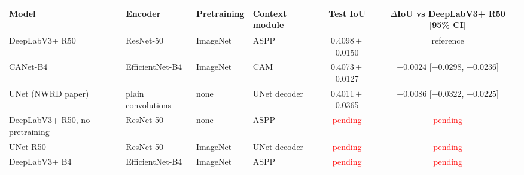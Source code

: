 \begin{tabular}{llllcc}
\toprule
Model & Encoder & Pretraining & Context module & Test IoU & $\Delta$IoU vs DeepLabV3+ R50 [95\% CI] \\
\midrule
DeepLabV3+ R50 & ResNet-50 & ImageNet & ASPP & 0.4098\,$\pm$\,0.0150 & reference \\
CANet-B4 & EfficientNet-B4 & ImageNet & CAM & 0.4073\,$\pm$\,0.0127 & $-0.0024$ [$-0.0298$, $+0.0236$] \\
UNet (NWRD paper) & plain convolutions & none & UNet decoder & 0.4011\,$\pm$\,0.0365 & $-0.0086$ [$-0.0322$, $+0.0225$] \\
DeepLabV3+ R50, no pretraining & ResNet-50 & none & ASPP & \textcolor{red}{pending} & \textcolor{red}{pending} \\
UNet R50 & ResNet-50 & ImageNet & UNet decoder & \textcolor{red}{pending} & \textcolor{red}{pending} \\
DeepLabV3+ B4 & EfficientNet-B4 & ImageNet & ASPP & \textcolor{red}{pending} & \textcolor{red}{pending} \\
\bottomrule
\end{tabular}
